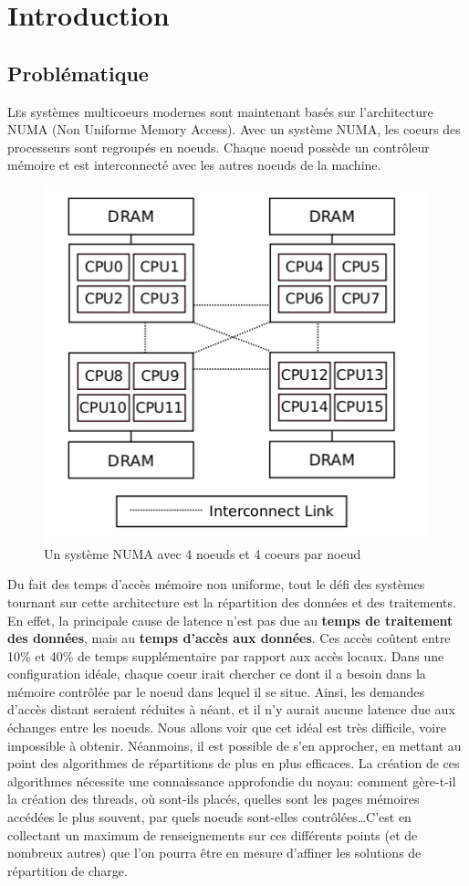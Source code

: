 \chapter{Introduction}
	\section{Problématique}
		\lettrine[nindent=0em,lines=3]{L} es systèmes multicoeurs modernes sont
		maintenant basés sur l'architecture NUMA (Non Uniforme Memory Access). Avec un
		système NUMA, les coeurs des processeurs sont regroupés en noeuds. Chaque
		noeud possède un contrôleur mémoire et est interconnecté avec les autres
		noeuds de la machine.
		
		\begin{figure}[H]
		  \centering
		  \includegraphics[scale=0.35]{img/numa_arch.png}
		  \caption{Un système NUMA avec 4 noeuds et 4 coeurs par noeud}
		  \label{f:numa_arch}
		\end{figure}
		
		Du fait des temps d'accès mémoire non uniforme, tout le défi des systèmes
		tournant sur cette architecture est la répartition des données et des
		traitements. En effet, la principale cause de latence n'est pas due au
		\textbf{temps de traitement des données}, mais au \textbf{temps d'accès aux
		  données}. Ces accès coûtent entre 10\% et 40\% de temps supplémentaire par
		rapport aux accès locaux.\cite{Lepers2014} Dans une configuration idéale,
		chaque coeur irait chercher ce dont il a besoin dans la mémoire contrôlée par
		le noeud dans lequel il se situe. Ainsi, les demandes d'accès distant seraient
		réduites à néant, et il n'y aurait aucune latence due aux échanges entre les
		noeuds. Nous allons voir que cet idéal est très difficile, voire impossible à
		obtenir. Néanmoins, il est possible de s'en approcher, en mettant au point des
		algorithmes de répartitions de plus en plus efficaces. La création de ces
		algorithmes nécessite une connaissance approfondie du noyau: comment gère-t-il
		la création des threads, où sont-ils placés, quelles sont les pages mémoires
		accédées le plus souvent, par quels noeuds sont-elles contrôlées\ldots C'est
		en collectant un maximum de renseignements sur ces différents points (et de
		nombreux autres) que l'on pourra être en mesure d'affiner les solutions de
		répartition de charge.
